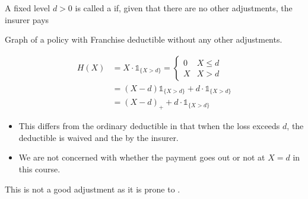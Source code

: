 \documentclass[notoc,notitlepage]{tufte-book}
\begin{document}
\begin{defn}\label{defn:franchise_deductible}
  A fixed level $d > 0$ is called a  if, given that there are no other adjustments, the insurer pays
  \begin{marginfigure}
    \caption{Graph of a policy with Franchise deductible without any other adjustments.}\label{fig:graph_of_a_policy_with_franchise_deductible_without_any_other_adjustments}
  \end{marginfigure}
  \begin{align*}
    H(X) &= X \cdot \mathbb{1}_{\{ X > d \}} = \begin{cases}
      0 & X \leq d \\
      X & X > d
    \end{cases} \\
    &= (X - d) \mathbb{1}_{\{X > d\}} + d \cdot \mathbb{1}_{\{ X > d\}} \\
    &= {(X - d)}_+ + d \cdot \mathbb{1}_{\{X > d\}}
  \end{align*}
\end{defn}

\begin{note}
  \begin{itemize}
    \item This differs from the ordinary deductible in that twhen the loss exceeds $d$, the deductible is waived and the  by the insurer.
    \item We are not concerned with whether the payment goes out or not at $X = d$ in this course.
  \end{itemize}
\end{note}

\begin{remark}
  This is not a good adjustment as it is prone to .
\end{remark}
\end{document}
